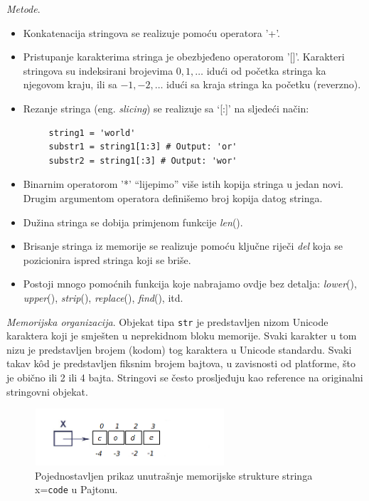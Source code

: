 \textit{Metode}.
\begin{itemize}
	\item Konkatenacija stringova se realizuje pomoću operatora '+'. 
	\item Pristupanje karakterima stringa je obezbjeđeno operatorom '[]'. Karakteri stringova su indeksirani brojevima $0, 1,\ldots$ idući od početka stringa ka njegovom kraju, ili sa $-1, -2,\ldots$ idući sa kraja stringa ka početku  (reverzno). 
	\item Rezanje stringa (eng. \textit{slicing}) se realizuje sa `[:]' na sljedeći način:
	\begin{verbatim}
	 string1 = 'world'
	 substr1 = string1[1:3] # Output: 'or'
	 substr2 = string1[:3] # Output: 'wor'
	\end{verbatim}
	
	\item  Binarnim operatorom '*' ``lijepimo'' više istih kopija stringa u jedan novi. Drugim argumentom operatora definišemo broj kopija datog stringa.  
	\item Dužina stringa se dobija primjenom funkcije \emph{len}(). 
	\item Brisanje stringa iz memorije se realizuje pomoću ključne riječi \textit{del} koja se pozicionira ispred stringa koji se briše. 
    \item Postoji mnogo pomoćnih funkcija koje nabrajamo ovdje bez detalja: \textit{lower}(), \textit{upper}(), \textit{strip}(), \textit{replace}(), \textit{find}(), itd. 
\end{itemize}

\textit{Memorijska organizacija}. Objekat tipa \texttt{str} je predstavljen nizom Unicode karaktera koji je smješten u neprekidnom bloku memorije. Svaki karakter u tom nizu je predstavljen brojem (kodom) tog karaktera u Unicode standardu. Svaki takav k\^od je predstavljen fiksnim brojem bajtova, u zavisnosti od platforme, što je obično ili 2 ili 4 bajta. Stringovi se često prosljeđuju kao reference na originalni stringovni objekat. %

	\begin{figure}
	\centering
	\includegraphics[width=200pt,height=60pt]{slike/str_mem_organization.png}
	\caption{Pojednostavljen prikaz unutrašnje memorijske strukture stringa x=\texttt{code}   u Pajtonu. }
\end{figure}


